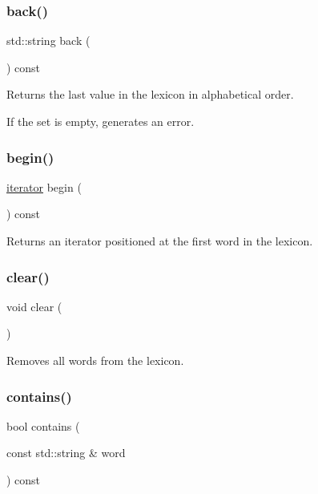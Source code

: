 \subsubsection{\texorpdfstring{back()}{back()}}
{\footnotesize\ttfamily std\+::string back (\begin{DoxyParamCaption}{ }\end{DoxyParamCaption}) const}



Returns the last value in the lexicon in alphabetical order. 

If the set is empty, generates an error. \mbox{\label{classLexicon_a0c62c15c8ed609e7e5e9518cf5f5c712}} 
\subsubsection{\texorpdfstring{begin()}{begin()}}
{\footnotesize\ttfamily \mbox{\hyperlink{classLexicon_1_1iterator}{iterator}} begin (\begin{DoxyParamCaption}{ }\end{DoxyParamCaption}) const\hspace{0.3cm}{\ttfamily [inline]}}



Returns an iterator positioned at the first word in the lexicon. 

\mbox{\label{classLexicon_ac8bb3912a3ce86b15842e79d0b421204}} 
\subsubsection{\texorpdfstring{clear()}{clear()}}
{\footnotesize\ttfamily void clear (\begin{DoxyParamCaption}{ }\end{DoxyParamCaption})}



Removes all words from the lexicon. 

\mbox{\label{classLexicon_a479b1bac4a3c243907c80e5c6f9b05d5}} 
\subsubsection{\texorpdfstring{contains()}{contains()}}
{\footnotesize\ttfamily bool contains (\begin{DoxyParamCaption}\item[{const std\+::string \&}]{word }\end{DoxyParamCaption}) const}




